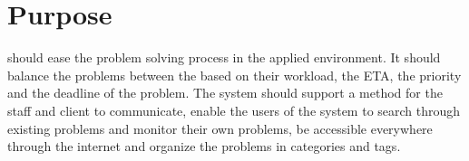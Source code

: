 \section{Purpose}
\hdesk[] should ease the problem solving process in the applied environment. 
It should balance the problems between the \astaff[] based on their workload, the ETA, the priority and the deadline of the problem.
The system should support a method for the staff and client to communicate, enable the users of the system to search through existing problems and monitor their own problems, be accessible everywhere through the internet and organize the problems in categories and tags. 

